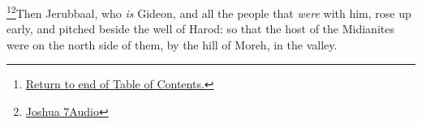 \footnote{\textcolor[rgb]{0.00,0.25,0.00}{\hyperlink{TOC}{Return to end of Table of Contents.}}}\footnote{\href{https://audiobible.com/bible/joshua_7.html}{\textcolor[cmyk]{0.99998,1,0,0}{Joshua 7Audio}}}\textcolor[rgb]{0.00,0.00,1.00}{Then Jerubbaal, who \emph{is} Gideon, and all the people that \emph{were} with him, rose up early, and pitched beside the well of Harod: so that the host of the Midianites were on the north side of them, by the hill of Moreh, in the valley.}%
